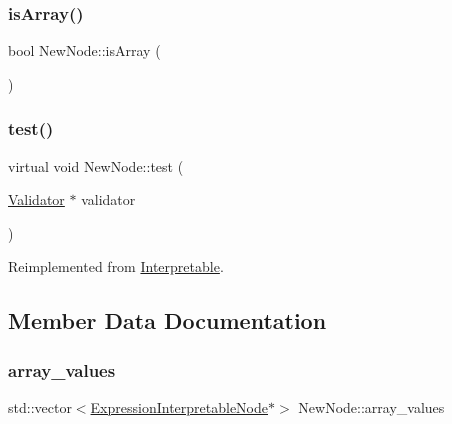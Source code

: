 \mbox{\label{classNewNode_af2d1614a80b8fcc00957155109e4b2f2}} 
\subsubsection{\texorpdfstring{is\+Array()}{isArray()}}
{\footnotesize\ttfamily bool New\+Node\+::is\+Array (\begin{DoxyParamCaption}{ }\end{DoxyParamCaption})}

\mbox{\label{classNewNode_a9be504d069e8a5d4ea13b4767a3c792a}} 
\subsubsection{\texorpdfstring{test()}{test()}}
{\footnotesize\ttfamily virtual void New\+Node\+::test (\begin{DoxyParamCaption}\item[{\hyperlink{classValidator}{Validator} $\ast$}]{validator }\end{DoxyParamCaption})\hspace{0.3cm}{\ttfamily [virtual]}}



Reimplemented from \hyperlink{classInterpretable_a32f547aaf68dcbab993284d3257ab010}{Interpretable}.



\subsection{Member Data Documentation}
\mbox{\label{classNewNode_afd78e7c3e05eb57a1536f705fb900fd5}} 
\subsubsection{\texorpdfstring{array\+\_\+values}{array\_values}}
{\footnotesize\ttfamily std\+::vector$<$\hyperlink{classExpressionInterpretableNode}{Expression\+Interpretable\+Node}$\ast$$>$ New\+Node\+::array\+\_\+values}

\mbox{\label{classNewNode_a1cf62395c1531a22ca8e1932ed82910c}} 
